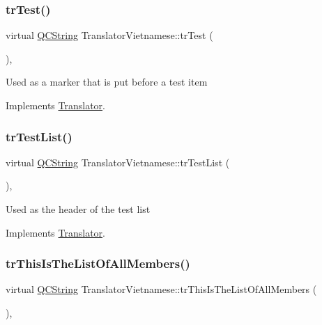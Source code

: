 \subsubsection{\texorpdfstring{trTest()}{trTest()}}
{\footnotesize\ttfamily virtual \mbox{\hyperlink{class_q_c_string}{Q\+C\+String}} Translator\+Vietnamese\+::tr\+Test (\begin{DoxyParamCaption}{ }\end{DoxyParamCaption})\hspace{0.3cm}{\ttfamily [inline]}, {\ttfamily [virtual]}}

Used as a marker that is put before a test item 

Implements \mbox{\hyperlink{class_translator}{Translator}}.

\mbox{\label{class_translator_vietnamese_afccef53de9569d659fc2cc23610b8492}} 
\subsubsection{\texorpdfstring{trTestList()}{trTestList()}}
{\footnotesize\ttfamily virtual \mbox{\hyperlink{class_q_c_string}{Q\+C\+String}} Translator\+Vietnamese\+::tr\+Test\+List (\begin{DoxyParamCaption}{ }\end{DoxyParamCaption})\hspace{0.3cm}{\ttfamily [inline]}, {\ttfamily [virtual]}}

Used as the header of the test list 

Implements \mbox{\hyperlink{class_translator}{Translator}}.

\mbox{\label{class_translator_vietnamese_a3d636a45afbf510a93b5c0874039d3cf}} 
\subsubsection{\texorpdfstring{trThisIsTheListOfAllMembers()}{trThisIsTheListOfAllMembers()}}
{\footnotesize\ttfamily virtual \mbox{\hyperlink{class_q_c_string}{Q\+C\+String}} Translator\+Vietnamese\+::tr\+This\+Is\+The\+List\+Of\+All\+Members (\begin{DoxyParamCaption}{ }\end{DoxyParamCaption})\hspace{0.3cm}{\ttfamily [inline]}, {\ttfamily [virtual]}}

